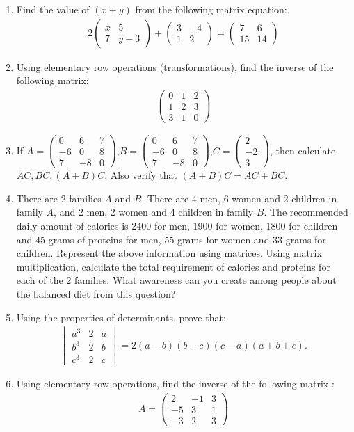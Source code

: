 \documentclass[12pt,-letter paper]{article}
\newcommand{\myvec}[1]{\ensuremath{\begin{pmatrix}#1\end{pmatrix}}}
\newcommand{\mydet}[1]{\ensuremath{\begin{vmatrix}#1\end{vmatrix}}}
\begin{document}
\begin{enumerate}
	\item Find the value of $(x+y)$ from the following matrix equation:
    \begin{align*}
        2 \myvec{x&5\\7&y-3}+\myvec{3&-4\\1&2} = \myvec{7&6\\15&14}
    \end{align*}

	\item Using elementary row operations (transformations), find the inverse of the following matrix:
    \begin{align*}
        \myvec{0&1&2\\1&2&3\\3&1&0}
    \end{align*}
    \item If $A = \myvec{0&6&7\\-6&0&8\\7&-8&0}$,$B =\myvec{0&6&7\\-6&0&8\\7&-8&0}$,$C = \myvec{2\\-2\\3}$, then calculate $AC,BC, (A+B)C$. Also verify that $(A+B)C= AC+BC$.

	\item There are 2 families $A$ and $B$. There are 4 men, 6 women and 2 children in family $A$, and 2 men, 2 women and 4 children in family $B$. The recommended daily amount of calories is 2400 for men, 1900 for women, 1800 for children and 45 grams of proteins for men, 55 grams for women and 33 grams for children. Represent the above information using matrices. Using matrix multiplication, calculate the total requirement of calories and proteins for each of the 2 families. What awareness can you create among people about the balanced diet from this question?

	\item Using the properties of determinants, prove that:
	\begin{align*}
		\mydet{a^3 & 2 & a \\
		b^3 & 2 & b\\
		c^3 & 2 & c} = 2(a - b) (b-c) (c-a) (a+b+c).
	\end{align*}
	
	\item Using elementary row operations, find the inverse of the following matrix :
	\begin{align*}
		A = \myvec{2 & -1 & 3\\
		-5 & 3 & 1 \\
		-3 & 2 & 3}
	\end{align*}




\end{enumerate}
\end{document}

